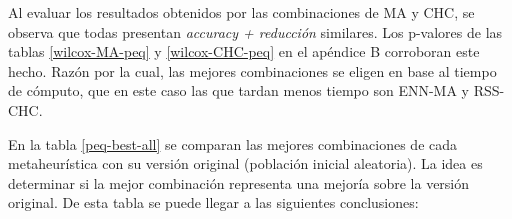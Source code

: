 Al evaluar los resultados obtenidos por las combinaciones de MA y CHC, se observa que todas presentan \emph{accuracy + reducción} similares. Los p-valores de las tablas \ref{wilcox-MA-peq} y \ref{wilcox-CHC-peq} en el apéndice B corroboran este hecho. Razón por la cual, las mejores combinaciones se eligen en base al tiempo de cómputo, que en este caso las que tardan menos tiempo son ENN-MA y RSS-CHC.


En la tabla \ref{peq-best-all} se comparan las mejores combinaciones de cada metaheurística con su versión original (población inicial aleatoria). La idea es determinar si la mejor combinación representa una mejoría sobre la versión original. De esta tabla se puede llegar a las siguientes conclusiones:

